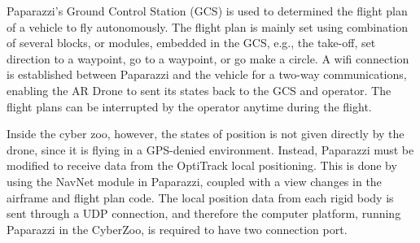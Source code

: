 {%

Paparazzi's Ground Control Station (GCS) is used to determined the flight plan of a vehicle to fly autonomously. The flight plan is mainly set using combination of several blocks, or modules, embedded in the GCS, e.g., the take-off, set direction to a waypoint, go to a waypoint, or go make a circle. A wifi connection is established between Paparazzi and the vehicle for a two-way communications, enabling the AR Drone to sent its states back to the GCS and operator. The flight plans can be interrupted by the operator anytime during the flight.

Inside the cyber zoo, however, the states of position is not given directly by the drone, since it is flying in a GPS-denied environment. Instead, Paparazzi must be modified to receive data from the OptiTrack local positioning. This is done by using the NavNet module in Paparazzi, coupled with a view changes in the airframe and flight plan code. The local position data from each rigid body is sent through a UDP connection, and therefore the computer platform, running Paparazzi in the CyberZoo, is required to have two connection port. 

}